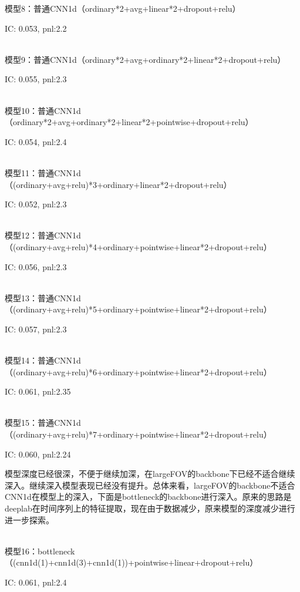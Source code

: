 \documentclass[11pt]{ctexart}
\begin{document}
模型8：普通CNN1d（ordinary*2+avg+linear*2+dropout+relu）

{\kaishu \small IC: 0.053, pnl:2.2}


~\\
模型9：普通CNN1d（ordinary*2+avg+ordinary*2+linear*2+dropout+relu）

{\kaishu \small IC: 0.055, pnl:2.3}


~\\
模型10：普通CNN1d（ordinary*2+avg+ordinary*2+linear*2+pointwise+dropout+relu）

{\kaishu \small IC: 0.054, pnl:2.4}


~\\
模型11：普通CNN1d（(ordinary+avg+relu)*3+ordinary+linear*2+dropout+relu）

{\kaishu \small IC: 0.052, pnl:2.3}



~\\
模型12：普通CNN1d（(ordinary+avg+relu)*4+ordinary+pointwise+linear*2+dropout+relu）

{\kaishu \small IC: 0.056, pnl:2.3}


~\\
模型13：普通CNN1d（(ordinary+avg+relu)*5+ordinary+pointwise+linear*2+dropout+relu）

{\kaishu \small IC: 0.057, pnl:2.3}


~\\
模型14：普通CNN1d（(ordinary+avg+relu)*6+ordinary+pointwise+linear*2+dropout+relu）

{\kaishu \small IC: 0.061, pnl:2.35}


~\\
模型15：普通CNN1d（(ordinary+avg+relu)*7+ordinary+pointwise+linear*2+dropout+relu）

{\kaishu \small IC: 0.060, pnl:2.24}

模型深度已经很深，不便于继续加深，在largeFOV的backbone下已经不适合继续深入。继续深入模型表现已经没有提升。总体来看，largeFOV的backbone不适合CNN1d在模型上的深入，下面是bottleneck的backbone进行深入。原来的思路是deeplab在时间序列上的特征提取，现在由于数据减少，原来模型的深度减少进行进一步探索。

~\\
模型16：bottleneck（(cnn1d(1)+cnn1d(3)+cnn1d(1))+pointwise+linear+dropout+relu）

{\kaishu \small IC: 0.061, pnl:2.4}
\end{document}
